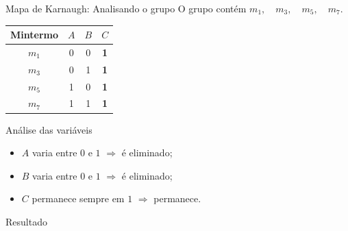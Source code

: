 \begin{frame}{Mapa de Karnaugh: Analisando o grupo}
    \small
    O grupo contém $m_1,\quad m_3,\quad m_5,\quad m_7$.

    \begin{center}
        \begin{tabular}{c|c c c}
            Mintermo & $A$ & $B$ & $C$ \\ \hline
            $m_1$ & 0 & 0 & \textbf{1} \\
            $m_3$ & 0 & 1 & \textbf{1} \\
            $m_5$ & 1 & 0 & \textbf{1} \\
            $m_7$ & 1 & 1 & \textbf{1}
        \end{tabular}
    \end{center}

    \begin{block}{Análise das variáveis}
        \begin{itemize}
            \item $A$ varia entre $0$ e $1$ $\Rightarrow$ é eliminado;
            \item $B$ varia entre $0$ e $1$ $\Rightarrow$ é eliminado;
            \item $C$ permanece sempre em $1$ $\Rightarrow$ permanece.
        \end{itemize}
    \end{block}

    \begin{alertblock}{Resultado}
    \end{alertblock}

\end{frame}
